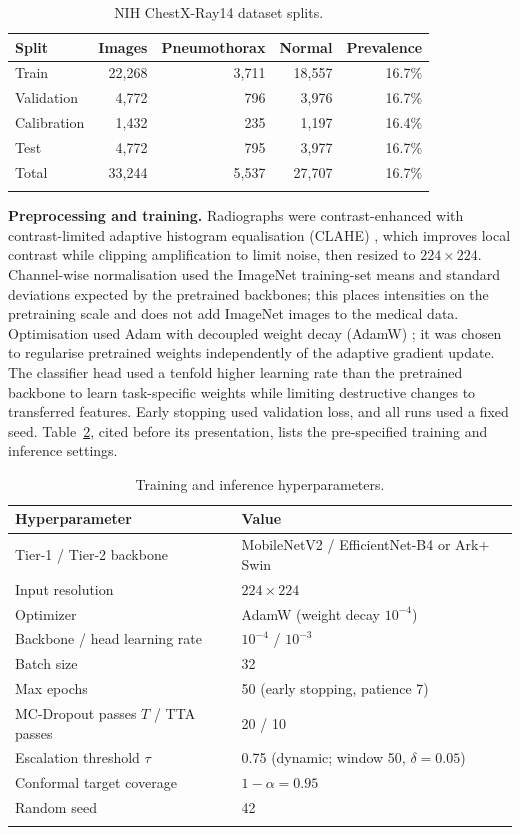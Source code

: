 \documentclass[pdflatex,sn-nature]{sn-jnl}
\begin{document}
\begin{table}[t]
\caption{NIH ChestX-Ray14 dataset splits.}\label{tab:dataset}
\begin{tabular}{@{}lrrrr@{}}
\toprule
Split & Images & Pneumothorax & Normal & Prevalence\\
\midrule
Train & 22,268 & 3,711 & 18,557 & 16.7\%\\
Validation & 4,772 & 796 & 3,976 & 16.7\%\\
Calibration & 1,432 & 235 & 1,197 & 16.4\%\\
Test & 4,772 & 795 & 3,977 & 16.7\%\\
\midrule
Total & 33,244 & 5,537 & 27,707 & 16.7\%\\
\botrule
\end{tabular}
\end{table}

\textbf{Preprocessing and training.} Radiographs were contrast-enhanced with contrast-limited adaptive histogram equalisation (CLAHE) \cite{zuiderveld1994contrast}, which improves local contrast while clipping amplification to limit noise, then resized to $224\times224$. Channel-wise normalisation used the ImageNet training-set means and standard deviations expected by the pretrained backbones; this places intensities on the pretraining scale and does not add ImageNet images to the medical data. Optimisation used Adam with decoupled weight decay (AdamW) \cite{loshchilov2019decoupled}; it was chosen to regularise pretrained weights independently of the adaptive gradient update. The classifier head used a tenfold higher learning rate than the pretrained backbone to learn task-specific weights while limiting destructive changes to transferred features. Early stopping used validation loss, and all runs used a fixed seed. Table~\ref{tab:hyper}, cited before its presentation, lists the pre-specified training and inference settings.

\begin{table}[t]
\caption{Training and inference hyperparameters.}\label{tab:hyper}
\begin{tabular}{@{}ll@{}}
\toprule
Hyperparameter & Value\\
\midrule
Tier-1 / Tier-2 backbone & MobileNetV2 / EfficientNet-B4 or Ark+ Swin\\
Input resolution & $224\times224$\\
Optimizer & AdamW (weight decay $10^{-4}$)\\
Backbone / head learning rate & $10^{-4}$ / $10^{-3}$\\
Batch size & 32\\
Max epochs & 50 (early stopping, patience 7)\\
MC-Dropout passes $T$ / TTA passes & 20 / 10\\
Escalation threshold $\tau$ & 0.75 (dynamic; window 50, $\delta=0.05$)\\
Conformal target coverage & $1-\alpha=0.95$\\
Random seed & 42\\
\botrule
\end{tabular}
\end{table}
\end{document}
